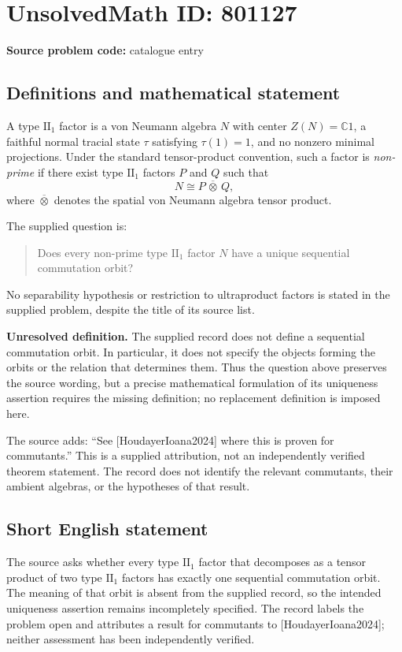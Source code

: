 \documentclass[11pt]{article}
\newcommand{\C}{\mathbb{C}}
\begin{document}
\section*{UnsolvedMath ID: 801127}
\textbf{Source problem code:} catalogue entry
\subsection{Definitions and mathematical statement}
A type $\mathrm{II}_1$ factor is a von Neumann algebra $N$ with center $Z(N)=\C 1$, a faithful normal tracial state $\tau$ satisfying $\tau(1)=1$, and no nonzero minimal projections. Under the standard tensor-product convention, such a factor is \emph{non-prime} if there exist type $\mathrm{II}_1$ factors $P$ and $Q$ such that
\[
N\cong P\,\overline{\otimes}\,Q,
\]
where $\overline{\otimes}$ denotes the spatial von Neumann algebra tensor product.

The supplied question is:
\begin{quote}
Does every non-prime type $\mathrm{II}_1$ factor $N$ have a unique sequential commutation orbit?
\end{quote}
No separability hypothesis or restriction to ultraproduct factors is stated in the supplied problem, despite the title of its source list.

\textbf{Unresolved definition.} The supplied record does not define a sequential commutation orbit. In particular, it does not specify the objects forming the orbits or the relation that determines them. Thus the question above preserves the source wording, but a precise mathematical formulation of its uniqueness assertion requires the missing definition; no replacement definition is imposed here.

The source adds: ``See [HoudayerIoana2024] where this is proven for commutants.'' This is a supplied attribution, not an independently verified theorem statement. The record does not identify the relevant commutants, their ambient algebras, or the hypotheses of that result.
\subsection{Short English statement}
The source asks whether every type $\mathrm{II}_1$ factor that decomposes as a tensor product of two type $\mathrm{II}_1$ factors has exactly one sequential commutation orbit. The meaning of that orbit is absent from the supplied record, so the intended uniqueness assertion remains incompletely specified. The record labels the problem open and attributes a result for commutants to [HoudayerIoana2024]; neither assessment has been independently verified.
\end{document}
